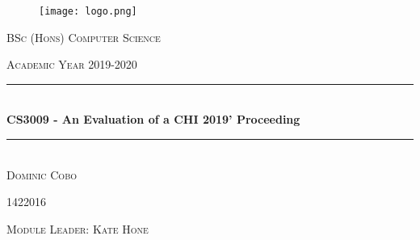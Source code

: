 \documentclass[a4paper, 10pt]{article}
\newcommand{\fypCourse}{BSc (Hons) Computer Science}
\newcommand{\fypStudent}{Dominic Cobo}
\newcommand{\fypStudentId}{1422016}
\newcommand{\moduleLeader}{Kate Hone}
\newcommand{\fypAcademicYear}{2019-2020}
\newcommand{\fypTitle}{CS3009 - An Evaluation of a CHI 2019' Proceeding}
\begin{document}
	\begin{titlepage}
		\centering
		\begin{figure}
			\texttt{[image: logo.png]}
		\end{figure}
		\textsc{\LARGE \fypCourse}
		
		\textsc{\large Academic Year \fypAcademicYear}
		
		\rule{\linewidth}{0.5mm} \\[0.5cm]
		{ \huge\textbf { \fypTitle } } \\
		\rule{\linewidth}{0.5mm} \\[6cm]
		
		
		\textsc{\huge \fypStudent}
		
		\textsc{\large \fypStudentId}
		
		\bigskip
		
		\textsc{\large Module Leader: \moduleLeader}
		
		\bigskip
		
	\end{titlepage}
	
	\newpage
	
	
	

	

	
\end{document}
